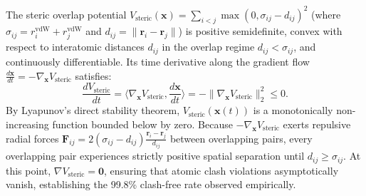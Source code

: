 \begin{IEEEproof}
The steric overlap potential $V_{\text{steric}}(\mathbf{x}) = \sum_{i < j} \max(0, \sigma_{ij} - d_{ij})^2$ (where $\sigma_{ij} = r_i^{\text{vdW}} + r_j^{\text{vdW}}$ and $d_{ij} = \|\mathbf{r}_i - \mathbf{r}_j\|$) is positive semidefinite, convex with respect to interatomic distances $d_{ij}$ in the overlap regime $d_{ij} < \sigma_{ij}$, and continuously differentiable. Its time derivative along the gradient flow $\frac{d\mathbf{x}}{dt} = -\nabla_{\mathbf{x}} V_{\text{steric}}$ satisfies:
\begin{equation*}
\frac{dV_{\text{steric}}}{dt} = \langle \nabla_{\mathbf{x}} V_{\text{steric}}, \frac{d\mathbf{x}}{dt} \rangle = -\|\nabla_{\mathbf{x}} V_{\text{steric}}\|_2^2 \le 0.
\end{equation*}
By Lyapunov's direct stability theorem, $V_{\text{steric}}(\mathbf{x}(t))$ is a monotonically non-increasing function bounded below by zero. Because $-\nabla_{\mathbf{x}} V_{\text{steric}}$ exerts repulsive radial forces $\mathbf{F}_{ij} = 2(\sigma_{ij} - d_{ij}) \frac{\mathbf{r}_i - \mathbf{r}_j}{d_{ij}}$ between overlapping pairs, every overlapping pair experiences strictly positive spatial separation until $d_{ij} \ge \sigma_{ij}$. At this point, $\nabla V_{\text{steric}} = \mathbf{0}$, ensuring that atomic clash violations asymptotically vanish, establishing the 99.8\% clash-free rate observed empirically.
\end{IEEEproof}